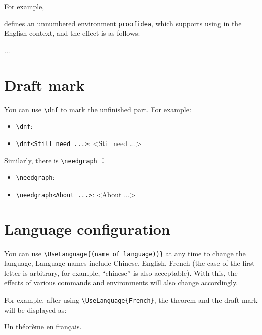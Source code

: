 \documentclass{simplivre}
\begin{document}
\def\proofideanameEN{Idea}

For example,

\begin{code}
  \def\proofideanameEN{Idea}
\end{code}

defines an unnumbered environment \lstinline|proofidea|, which supports using in the English context, and the effect is as follows:

\begin{proofidea}
    ...
\end{proofidea}

\section{Draft mark}

You can use \lstinline|\dnf| to mark the unfinished part. For example:
\begin{itemize}
    \item \lstinline|\dnf|: \quad \dnf
    \item \lstinline|\dnf<Still need ...>|: \quad \dnf<Still need ...>
\end{itemize}

Similarly, there is \lstinline|\needgraph| ：
\begin{itemize}
    \item \lstinline|\needgraph|: \needgraph
    \item \lstinline|\needgraph<About ...>|: \needgraph<About ...>
\end{itemize}

\section{Language configuration}
You can use \lstinline|\UseLanguage{(name of language))}| at any time to change the language, Language names include Chinese, English, French (the case of the first letter is arbitrary, for example, ``chinese'' is also acceptable). With this, the effects of various commands and environments will also change accordingly.

For example, after using \lstinline|\UseLanguage{French}|, the theorem and the draft mark will be displayed as:

\begin{theorem}[Inutile]\label{thm}
    Un théorème en français. \dnf
\end{theorem}
\end{document}
